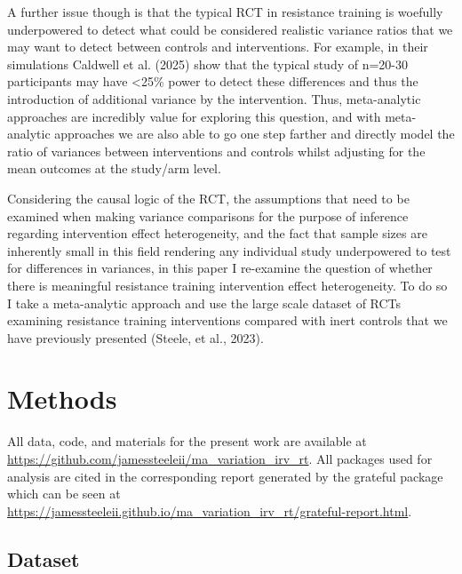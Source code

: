 \documentclass[
]{article}
\begin{document}
A further issue though is that the typical RCT in resistance training is
woefully underpowered to detect what could be considered realistic
variance ratios that we may want to detect between controls and
interventions. For example, in their simulations Caldwell et al. (2025)
show that the typical study of n=20-30 participants may have
\textless25\% power to detect these differences and thus the
introduction of additional variance by the intervention. Thus,
meta-analytic approaches are incredibly value for exploring this
question, and with meta-analytic approaches we are also able to go one
step farther and directly model the ratio of variances between
interventions and controls whilst adjusting for the mean outcomes at the
study/arm level.

Considering the causal logic of the RCT, the assumptions that need to be
examined when making variance comparisons for the purpose of inference
regarding intervention effect heterogeneity, and the fact that sample
sizes are inherently small in this field rendering any individual study
underpowered to test for differences in variances, in this paper I
re-examine the question of whether there is meaningful resistance
training intervention effect heterogeneity. To do so I take a
meta-analytic approach and use the large scale dataset of RCTs examining
resistance training interventions compared with inert controls that we
have previously presented ({Steele, et al.}, 2023).

\section{Methods}\label{methods}

All data, code, and materials for the present work are available at
\url{https://github.com/jamessteeleii/ma_variation_irv_rt}. All packages
used for analysis are cited in the corresponding report generated by the
grateful package which can be seen at
\url{https://jamessteeleii.github.io/ma_variation_irv_rt/grateful-report.html}.

\subsection{Dataset}\label{dataset}
\end{document}
